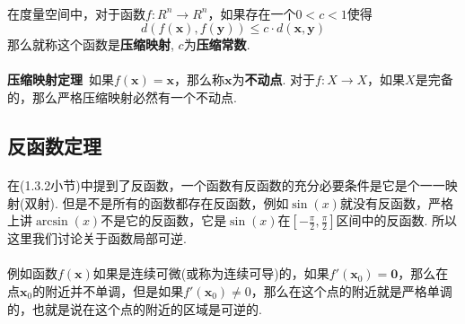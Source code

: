 \paragraph{}
在度量空间中，对于函数$f: R^n \to R^n$，如果存在一个$0 < c < 1$使得
$$
d(f(\textbf{x}), f(\textbf{y})) \leq c \cdot d(\textbf{x}, \textbf{y})
$$
那么就称这个函数是\textbf{压缩映射}, $c$为\textbf{压缩常数}.

\paragraph{}
\textbf{压缩映射定理}\, 如果$f(\textbf{x}) = \textbf{x}$，那么称$\textbf{x}$为\textbf{不动点}. 对于$f: X \to X$，如果$X$是完备的，那么严格压缩映射必然有一个不动点. 

\subsection{反函数定理}
\paragraph{}
在(1.3.2小节)中提到了反函数，一个函数有反函数的充分必要条件是它是个一一映射(双射). 但是不是所有的函数都存在反函数，例如$\sin(x)$就没有反函数，严格上讲$\arcsin(x)$不是它的反函数，它是$\sin(x)$在$[-\frac{\pi}{2}, \frac{\pi}{2}]$区间中的反函数. 所以这里我们讨论关于函数局部可逆. 

\paragraph{}
例如函数$f(\textbf{x})$如果是连续可微(或称为连续可导)的，如果$f'(\textbf{x}_0) = \textbf{0}$，那么在点$\textbf{x}_0$的附近并不单调，但是如果$f'(\textbf{x}_0) \neq 0$，那么在这个点的附近就是严格单调的，也就是说在这个点的附近的区域是可逆的.

